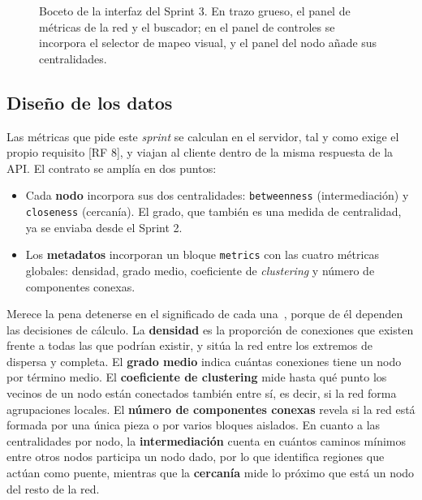 \begin{figure}[H]
	\caption[Boceto de la interfaz del Sprint 3.]{Boceto de la interfaz del Sprint 3. En trazo grueso, el panel de métricas de la red y el
	buscador; en el panel de controles se incorpora el selector de mapeo visual, y el panel del nodo
	añade sus centralidades.}
	\label{fig:mockup-s3}
\end{figure}

\subsection{Diseño de los datos}

Las métricas que pide este \textit{sprint} se calculan en el servidor, tal y como exige el propio
requisito [RF 8], y viajan al cliente dentro de la misma respuesta de la API. El contrato se amplía
en dos puntos:

\begin{itemize}
	\item Cada \textbf{nodo} incorpora sus dos centralidades: \texttt{betweenness}
		(intermediación) y \texttt{closeness} (cercanía). El grado, que también es una medida de
		centralidad, ya se enviaba desde el Sprint 2.
	\item Los \textbf{metadatos} incorporan un bloque \texttt{metrics} con las cuatro métricas
		globales: densidad, grado medio, coeficiente de \textit{clustering} y número de componentes
		conexas.
\end{itemize}

Merece la pena detenerse en el significado de cada una~\cite{bullmore2009}, porque de él dependen
las decisiones de cálculo. La \textbf{densidad} es la proporción de conexiones que existen frente a todas las que
podrían existir, y sitúa la red entre los extremos de dispersa y completa. El \textbf{grado medio}
indica cuántas conexiones tiene un nodo por término medio. El \textbf{coeficiente de clustering}
mide hasta qué punto los vecinos de un nodo están conectados también entre sí, es decir, si la red
forma agrupaciones locales. El \textbf{número de componentes conexas} revela si la red está formada
por una única pieza o por varios bloques aislados. En cuanto a las centralidades por nodo, la
\textbf{intermediación} cuenta en cuántos caminos mínimos entre otros nodos participa un nodo dado,
por lo que identifica regiones que actúan como puente, mientras que la \textbf{cercanía} mide lo
próximo que está un nodo del resto de la red.

